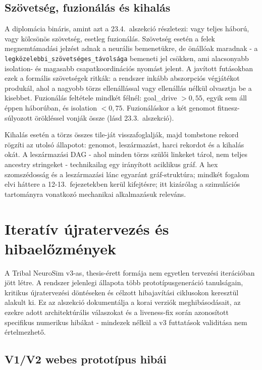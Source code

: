 ﻿\documentclass[a4paper,12pt]{report}
\begin{document}
\subsection*{Szövetség, fuzionálás és kihalás}

A diplomácia bináris, amint azt a 23.4.~alszekció részletezi: vagy teljes háború, vagy kölcsönös szövetség, esetleg fuzionálás. Szövetség esetén a felek megnemtámadási jelzést adnak a neurális bemenetükre, de önállóak maradnak - a \texttt{legközelebbi\_szövetséges\_távolsága} bemeneti jel csökken, ami alacsonyabb isolation- és magasabb csapatkoordinációs nyomást jelent. A javított futásokban ezek a formális szövetségek ritkák: a rendszer inkább abszorpciós végjátékot produkál, ahol a nagyobb törzs ellenállással vagy ellenállás nélkül olvasztja be a kisebbet. Fuzionálás feltétele mindkét félnél: goal\_drive $> 0{,}55$, egyik sem áll éppen háborúban, és isolation $< 0{,}75$. Fuzionáláskor a két genomot fitnesz-súlyozott örökléssel vonják össze (lásd 23.3.~alszekció).

Kihalás esetén a törzs összes tile-ját visszafoglalják, majd tombstone rekord rögzíti az utolsó állapotot: genomot, leszármazást, harci rekordot és a kihalás okát. A leszármazási DAG - ahol minden törzs szülői linkeket tárol, nem teljes ancestry stringeket - technikailag egy irányított aciklikus gráf. A hex szomszédosság és a leszármazási lánc egyaránt gráf-struktúra; mindkét fogalom elvi háttere a 12-13.~fejezetekben kerül kifejtésre; itt kizárólag a szimulációs tartományra vonatkozó mechanikai alkalmazásuk releváns.

\section{Iteratív újratervezés és hibaelőzmények}
\label{sec:neurosim-26-redesign}

A Tribal NeuroSim v3-as, thesis-érett formája nem egyetlen tervezési iterációban jött létre. A rendszer jelenlegi állapota több prototípusgeneráció tanulságain, kritikus újratervezési döntéseken és célzott hibajavítási ciklusokon keresztül alakult ki. Ez az alszekció dokumentálja a korai verziók meghibásodásait, az ezekre adott architektúrális válaszokat és a liveness-fix során azonosított specifikus numerikus hibákat - mindezek nélkül a v3 futtatások validitása nem értelmezhető.

\subsection*{V1/V2 webes prototípus hibái}
\end{document}
